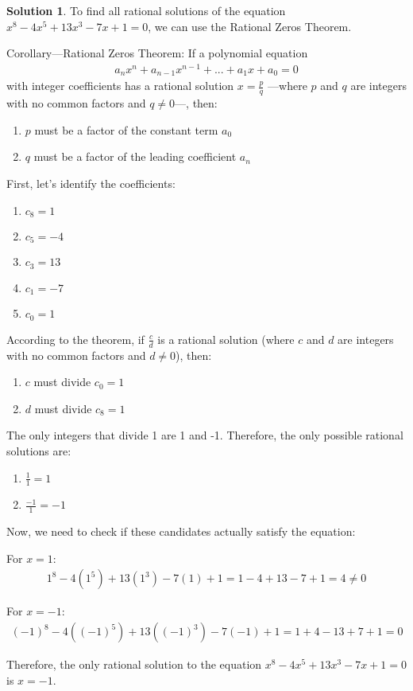\documentclass[12pt]{article}
\theoremstyle{definition} %
\newtheorem{solution}{Solution}
\theoremstyle{plain} %
\begin{document}
  \begin{solution}
      To find all rational solutions of the equation $x^8-4x^5+13x^3-7x+1=0$, we can use the Rational Zeros Theorem.
  
  Corollary—Rational Zeros Theorem: If a polynomial equation 
  \begin{align}
  a_nx^n + a_{n-1}x^{n-1} + ... + a_1x + a_0 = 0
  \end{align}
  with integer coefficients has a rational solution $x = \frac{p}{q}$ 
  —where $p$ and $q$ are integers with no common factors and $q \neq 0$—, then:
  \begin{enumerate}
      \item $p$ must be a factor of the constant term $a_0$
      \item $q$ must be a factor of the leading coefficient $a_n$
  \end{enumerate}
  
  First, let's identify the coefficients:
  \begin{enumerate}
      \item $c_8 = 1$
      \item $c_5 = -4$
      \item $c_3 = 13$
      \item $c_1 = -7$
      \item $c_0 = 1$
  \end{enumerate}
  
  According to the theorem, if $\frac{c}{d}$ is a rational solution (where $c$ and $d$ are integers with no common factors and $d \neq 0$), then:
  \begin{enumerate}
      \item $c$ must divide $c_0 = 1$
      \item $d$ must divide $c_8 = 1$
  \end{enumerate}
  
  The only integers that divide 1 are 1 and -1. Therefore, the only possible rational solutions are:
  \begin{enumerate}
      \item $\frac{1}{1} = 1$
      \item $\frac{-1}{1} = -1$
  \end{enumerate}
  
  Now, we need to check if these candidates actually satisfy the equation:
  
  For $x = 1$:
  \begin{align}
  1^8 - 4(1^5) + 13(1^3) - 7(1) + 1 = 1 - 4 + 13 - 7 + 1 = 4 \neq 0
  \end{align}
  
  For $x = -1$:
  \begin{align}
  (-1)^8 - 4((-1)^5) + 13((-1)^3) - 7(-1) + 1 = 1 + 4 - 13 + 7 + 1 = 0
  \end{align}
  
  Therefore, the only rational solution to the equation $x^8-4x^5+13x^3-7x+1=0$ is $x = -1$.
  \end{solution}
  
\end{document}
